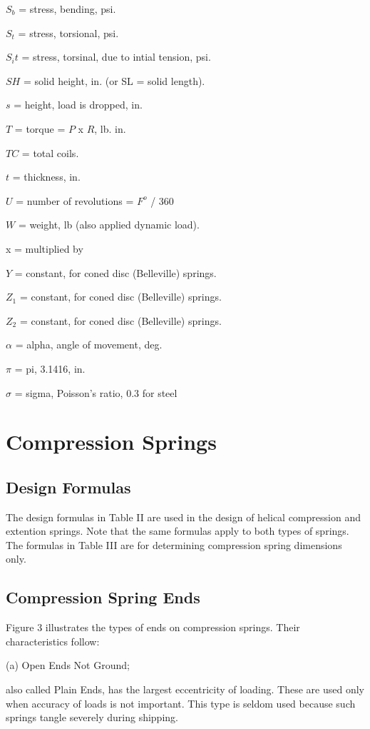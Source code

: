 \documentclass[10pt]{article}
\begin{document}
$S_b$ = stress, bending, psi.

$S_t$ = stress, torsional, psi.

$S_it$ = stress, torsinal, due to intial tension, psi.

$SH$ = solid height, in. (or SL = solid length).

$s$ = height, load is dropped, in.

$T$ = torque = $P$ x $R$, lb. in.

$TC$ = total coils.

$t$ = thickness, in.

$U$ = number of revolutions = $F^o$ / 360

$W$ = weight, lb (also applied dynamic load).

x = multiplied by

$Y$ = constant, for coned disc (Belleville) springs.

$Z_1$ = constant, for coned disc (Belleville) springs.

$Z_2$ = constant, for coned disc (Belleville) springs.

$\alpha$ = alpha, angle of movement, deg.

$\pi$ = pi, 3.1416, in.

$\sigma$ = sigma, Poisson's ratio, 0.3 for steel

\setcounter{section}{20} %
\section{Compression Springs} %
\subsection{Design Formulas} %
The design formulas in Table II are used in the design of helical compression and extention springs.
Note that the same formulas apply to both types of springs. 
The formulas in Table III are for determining compression spring dimensions only.

\subsection{Compression Spring Ends} %
Figure 3 illustrates the types of ends on compression springs. 
Their characteristics follow:

(a) Open Ends Not Ground; 

also called Plain Ends, has the largest eccentricity of loading. 
These are used only when accuracy of loads is not important. 
This type is seldom used because such springs tangle severely during shipping.
\end{document}
